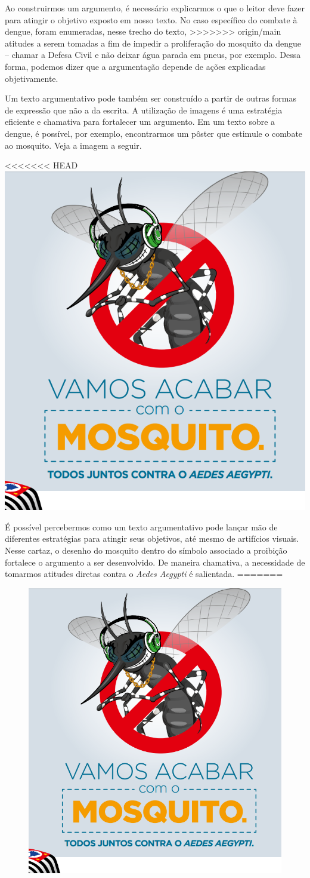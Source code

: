 {{Ao construirmos um argumento, é necessário explicarmos o que o leitor
deve fazer para atingir o objetivo exposto em nosso texto. No caso
específico do combate à dengue, foram enumeradas, nesse trecho do texto,
>>>>>>> origin/main
atitudes a serem tomadas a fim de impedir a proliferação do mosquito da
dengue -- chamar a Defesa Civil e não deixar água parada em pneus, por exemplo.
Dessa forma, podemos dizer que a argumentação depende de ações
explicadas objetivamente.

Um texto argumentativo pode também ser construído a partir de outras
formas de expressão que não a da escrita. A utilização de imagens é uma
estratégia eficiente e chamativa para fortalecer um argumento. Em um
texto sobre a dengue, é possível, por exemplo, encontrarmos um pôster
que estimule o combate ao mosquito. Veja a imagem a seguir.

<<<<<<< HEAD
\includegraphics[width=.5\textwidth]{./imgs/img11.png}

É possível percebermos como um texto argumentativo pode lançar mão de
diferentes estratégias para atingir seus objetivos, até mesmo de
artifícios visuais. Nesse cartaz, o desenho do mosquito dentro do
símbolo associado a proibição fortalece o argumento a ser desenvolvido.
De maneira chamativa, a necessidade de tomarmos atitudes diretas contra o
\textit{Aedes Aegypti} é salientada.
=======
\begin{figure}
\includegraphics[width=.4\textwidth]{./imgs/img11.png}
\end{figure}

}}
